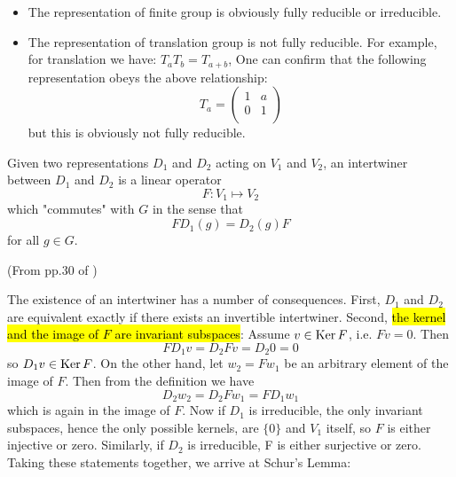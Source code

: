 \begin{ex}$ $

    \begin{itemize}
        \item The representation of finite group is obviously fully
            reducible or irreducible. %
        \item The representation of translation group is not fully
            reducible. For example, for translation we have:
            $T_a T_b = T_{a+b}$,
            One can confirm that the following representation obeys
            the above relationship:
            $$T_a = \left( \begin{array}{cc}
                 1 & a \\
                 0 & 1 \\
            \end{array} \right)$$
            but this is obviously not fully reducible.
    \end{itemize}
\end{ex}

\begin{defi}[Interwiner]
    Given two representations $D_1$ and $D_2$ acting on $V_1$ and
    $V_2$, an intertwiner between $D_1$ and $D_2$ is a linear operator
    \begin{equation}
        F: V_1 \mapsto V_2
    \end{equation}
    which "commutes" with $G$ in the sense that
    \begin{equation}
        F D_1(g) = D_2(g) F
    \end{equation}
    for all $g\in G$.
\end{defi}

(From pp.30 of \cite{Ludeling})

The existence of an intertwiner has a number of consequences. First,
$D_1$ and $D_2$ are equivalent exactly if there exists an invertible
intertwiner. Second, \hl{the kernel and the image of $F$ are invariant
subspaces}: Assume $v\in \operatorname{Ker}{F}$, i.e. $Fv = 0$. Then
\begin{equation}
    FD_1 v = D_2 F v = D_2 0 = 0
\end{equation}
so $D_1 v\in \operatorname{Ker}{F}$. On the other hand, let $w_2 = Fw_1$ be an
arbitrary element of the image of $F$. Then from the definition we have
\begin{equation}
    D_2 w_2 = D_2 F w_1 = FD_1 w_1
\end{equation}
which is again in the image of $F$. Now if $D_1$ is irreducible, the only invariant subspaces,
hence the only possible kernels, are $\{0\}$ and $V_1$ itself, so $F$ is either injective or zero.
Similarly, if $D_2$ is irreducible, F is either surjective or zero. Taking these statements together, we arrive at Schur’s Lemma: 

